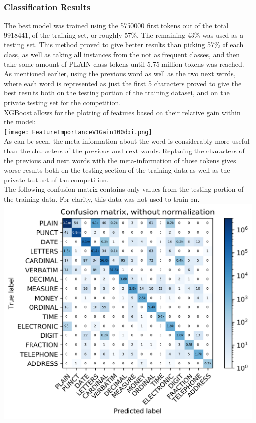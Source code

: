 \documentclass[a4paper, 9pt]{extarticle}
\begin{document}
\subsubsection{Classification Results}
The best model was trained using the 5750000 first tokens out of the total 9918441, of the training set, or roughly 57\%. The remaining 43\% was used as a testing set. This method proved to give better results than picking 57\% of each class, as well as taking all instances from the not as frequent classes, and then take some amount of PLAIN class tokens until 5.75 million tokens was reached.\\
As mentioned earlier, using the previous word as well as the two next words, where each word is represented as just the first 5 characters proved to give the best results both on the testing portion of the training dataset, and on the private testing set for the competition.\\
XGBoost allows for the plotting of features based on their relative gain within the model:\\
\texttt{[image: FeatureImportanceV1Gain100dpi.png]}\\
As can be seen, the meta-information about the word is considerably more useful than the characters of the previous and next words. Replacing the characters of the previous and next words with the meta-information of those tokens gives worse results both on the testing section of the training data as well as the private test set of the competition.\\
The following confusion matrix contains only values from the testing portion of the training data. For clarity, this data was not used to train on.\\
\includegraphics[scale=1]{ConfusionMatrix_v1_limit_bigfont.png}\\
\end{document}
